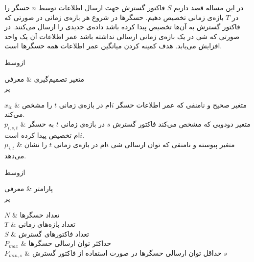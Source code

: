 

در این مساله قصد داریم $S$ فاکتور گسترش جهت ارسال اطلاعات توسط $n$ حسگر را در $T$ بازه‌ی زمانی تخصیص دهیم.
حسگرها در شروع هر بازه‌ی زمانی در صورتی که فاکتور گسترش به آن‌ها تخصیص پیدا کرده باشد داده‌ی جدیدی را ارسال می‌کنند.
در صورتی که شی در یک بازه‌ی زمانی ارسالی نداشته باشد عمر اطلاعات آن یک واحد افزایش می‌یابد.
هدف کمینه کردن میانگین عمر اطلاعات همه حسگر‌ها است.


‌ازوسط



متغیر تصمیم‌گیری & معرفی \\

‌پر

$x_{it}$ & متغیر صحیح و نامنفی که عمر اطلاعات حسگر $i$ام در بازه‌ی زمانی $t$ را مشخص می‌کند. \\

$p_{i,s,t}$ & متغیر دودویی که مشخص می‌کند فاکتور گسترش $s$ در بازه‌ی زمانی $t$ به حسگر $i$ام تخصیص پیدا کرده است. \\

$\mu_{i,t}$ & متغیر پیوسته و نامنفی که توان ارسالی شی $i$ام در بازه‌ی زمانی $t$ را نشان می‌دهد. \\





‌ازوسط



پارامتر & معرفی \\

‌پر

$N$ & تعداد حسگرها \\

$T$ & تعداد بازه‌های زمانی \\

$S$ & تعداد فاکتورهای گسترش \\

$P_{max}$ & حداکثر توان ارسالی حسگرها \\

$P_{min, s}$ & حداقل توان ارسالی حسگرها در صورت استفاده از فاکتور گسترش $s$ \\

